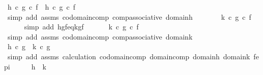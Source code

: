 \begin{isabellebody}
\ {\isachardoublequoteopen}{\isacharparenleft}{\kern0pt}h\ {\isasymcirc}\isactrlsub c\ g{\isacharparenright}{\kern0pt}\ {\isasymcirc}\isactrlsub c\ f\ {\isacharequal}{\kern0pt}\ h\ {\isasymcirc}\isactrlsub c\ {\isacharparenleft}{\kern0pt}g\ {\isasymcirc}\isactrlsub c\ f{\isacharparenright}{\kern0pt}{\isachardoublequoteclose}\isanewline
\ \ \ \ \isamarkupfalse%
\ {\isacharparenleft}{\kern0pt}simp\ add{\isacharcolon}{\kern0pt}\ assms\ codomain{\isacharunderscore}{\kern0pt}comp\ comp{\isacharunderscore}{\kern0pt}associative\ domain{\isacharunderscore}{\kern0pt}h{\isacharparenright}{\kern0pt}\isanewline
\ \ \isamarkupfalse%
\ \isamarkupfalse%
\ {\isachardoublequoteopen}{\isachardot}{\kern0pt}{\isachardot}{\kern0pt}{\isachardot}{\kern0pt}\ {\isacharequal}{\kern0pt}\ k\ {\isasymcirc}\isactrlsub c\ {\isacharparenleft}{\kern0pt}g\ {\isasymcirc}\isactrlsub c\ f{\isacharparenright}{\kern0pt}{\isachardoublequoteclose}\isanewline
\ \ \ \ \isamarkupfalse%
\ {\isacharparenleft}{\kern0pt}simp\ add{\isacharcolon}{\kern0pt}\ hgf{\isacharunderscore}{\kern0pt}eq{\isacharunderscore}{\kern0pt}kgf{\isacharparenright}{\kern0pt}\isanewline
\ \ \isamarkupfalse%
\ \isamarkupfalse%
\ {\isachardoublequoteopen}{\isachardot}{\kern0pt}{\isachardot}{\kern0pt}{\isachardot}{\kern0pt}\ {\isacharequal}{\kern0pt}{\isacharparenleft}{\kern0pt}k\ {\isasymcirc}\isactrlsub c\ g{\isacharparenright}{\kern0pt}\ {\isasymcirc}\isactrlsub c\ f\ {\isachardoublequoteclose}\isanewline
\ \ \ \ \isamarkupfalse%
\ {\isacharparenleft}{\kern0pt}simp\ add{\isacharcolon}{\kern0pt}\ assms\ codomain{\isacharunderscore}{\kern0pt}comp\ comp{\isacharunderscore}{\kern0pt}associative\ domain{\isacharunderscore}{\kern0pt}k{\isacharparenright}{\kern0pt}\isanewline
\ \isanewline
\ \ \isamarkupfalse%
\ \isamarkupfalse%
\ {\isachardoublequoteopen}h\ {\isasymcirc}\isactrlsub c\ g\ {\isacharequal}{\kern0pt}\ k\ {\isasymcirc}\isactrlsub c\ g{\isachardoublequoteclose}\isanewline
\ \ \ \ \isamarkupfalse%
\ {\isacharparenleft}{\kern0pt}simp\ add{\isacharcolon}{\kern0pt}\ assms\ calculation\ codomain{\isacharunderscore}{\kern0pt}comp\ domain{\isacharunderscore}{\kern0pt}comp\ domain{\isacharunderscore}{\kern0pt}h\ domain{\isacharunderscore}{\kern0pt}k\ f{\isacharunderscore}{\kern0pt}epi{\isacharparenright}{\kern0pt}\isanewline
\ \ \isamarkupfalse%
\ \isamarkupfalse%
\ {\isachardoublequoteopen}h\ {\isacharequal}{\kern0pt}\ k{\isachardoublequoteclose}\isanewline

\end{isabellebody}
